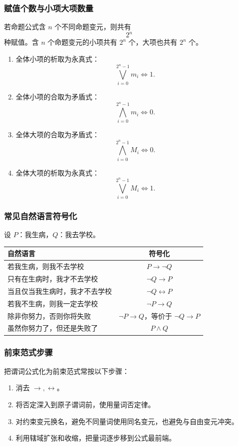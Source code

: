 \subsubsection{赋值个数与小项大项数量}

若命题公式含 \(n\) 个不同命题变元，则共有
\[
2^n
\]
种赋值。含 \(n\) 个命题变元的小项共有 \(2^n\) 个，大项也共有 \(2^n\) 个。

\begin{enumerate}
	\item 全体小项的析取为永真式：
	\[
	\bigvee_{i=0}^{2^n-1}m_i\Leftrightarrow 1.
	\]
	\item 全体小项的合取为矛盾式：
	\[
	\bigwedge_{i=0}^{2^n-1}m_i\Leftrightarrow 0.
	\]
	\item 全体大项的合取为矛盾式：
	\[
	\bigwedge_{i=0}^{2^n-1}M_i\Leftrightarrow 0.
	\]
	\item 全体大项的析取为永真式：
	\[
	\bigvee_{i=0}^{2^n-1}M_i\Leftrightarrow 1.
	\]
\end{enumerate}

\subsubsection{常见自然语言符号化}

设 \(P\)：我生病，\(Q\)：我去学校。
\begin{center}
	\begin{tabular}{p{7cm}c}
		\toprule
		自然语言 & 符号化\\
		\midrule
		若我生病，则我不去学校 & \(P\to\neg Q\)\\
		只有在生病时，我才不去学校 & \(\neg Q\to P\)\\
		当且仅当我生病时，我才不去学校 & \(\neg Q\leftrightarrow P\)\\
		若我不生病，则我一定去学校 & \(\neg P\to Q\)\\
		除非你努力，否则你将失败 & \(\neg P\to Q\)，等价于 \(\neg Q\to P\)\\
		虽然你努力了，但还是失败了 & \(P\land Q\)\\
		\bottomrule
	\end{tabular}
\end{center}

\subsubsection{前束范式步骤}

把谓词公式化为前束范式常按以下步骤：
\begin{enumerate}
	\item 消去 \(\to,\leftrightarrow\)。
	\item 将否定深入到原子谓词前，使用量词否定律。
	\item 对约束变元换名，避免不同量词使用同名变元，也避免与自由变元冲突。
	\item 利用辖域扩张和收缩，把量词逐步移到公式最前端。
\end{enumerate}

